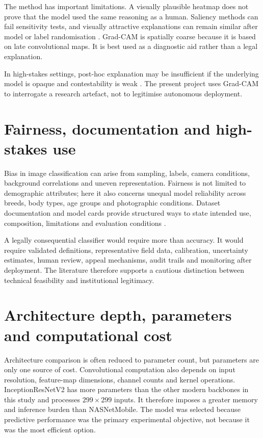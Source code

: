 The method has important limitations. A visually plausible heatmap does not prove that the model used the same reasoning as a human. Saliency methods can fail sensitivity tests, and visually attractive explanations can remain similar after model or label randomisation \citep{adebayo2018sanity}. Grad-CAM is spatially coarse because it is based on late convolutional maps. It is best used as a diagnostic aid rather than a legal explanation.

In high-stakes settings, post-hoc explanation may be insufficient if the underlying model is opaque and contestability is weak \citep{rudin2019stop}. The present project uses Grad-CAM to interrogate a research artefact, not to legitimise autonomous deployment.

\section{Fairness, documentation and high-stakes use}
Bias in image classification can arise from sampling, labels, camera conditions, background correlations and uneven representation. Fairness is not limited to demographic attributes; here it also concerns unequal model reliability across breeds, body types, age groups and photographic conditions. Dataset documentation and model cards provide structured ways to state intended use, composition, limitations and evaluation conditions \citep{gebru2021datasheets,mitchell2019modelcards}.

A legally consequential classifier would require more than accuracy. It would require validated definitions, representative field data, calibration, uncertainty estimates, human review, appeal mechanisms, audit trails and monitoring after deployment. The literature therefore supports a cautious distinction between technical feasibility and institutional legitimacy.

\section{Architecture depth, parameters and computational cost}
Architecture comparison is often reduced to parameter count, but parameters are only one source of cost. Convolutional computation also depends on input resolution, feature-map dimensions, channel counts and kernel operations. InceptionResNetV2 has more parameters than the other modern backbones in this study and processes $299\times299$ inputs. It therefore imposes a greater memory and inference burden than NASNetMobile. The model was selected because predictive performance was the primary experimental objective, not because it was the most efficient option.

